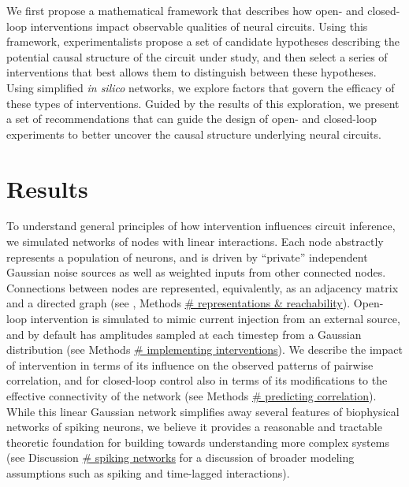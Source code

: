 \documentclass{article}
\begin{document}
We first propose a mathematical framework that describes how open- and closed-loop interventions impact observable qualities of neural circuits. Using this framework, experimentalists propose a set of candidate hypotheses describing the potential causal structure of the circuit under study, and then select a series of interventions that best allows them to distinguish between these hypotheses. Using simplified
\emph{in silico} networks, we explore factors that govern the efficacy of these types of interventions. Guided by the results of this exploration, we present a set of recommendations that can guide the design of open- and closed-loop experiments to better uncover the causal structure underlying neural circuits.

\hypertarget{results}{%
\section{Results}\label{results}}

To understand general principles of how intervention influences circuit inference, we simulated networks of nodes with linear interactions. Each node abstractly represents a population of neurons, and is driven by
``private'' independent Gaussian noise sources as well as weighted inputs from other connected nodes. Connections between nodes are represented, equivalently, as an adjacency matrix and a directed graph
(see \textcite{fornito2016connectivity}, Methods
\href{REF-SECTION-HERE}{\# representations \& reachability}). Open-loop intervention is simulated to mimic current injection from an external source, and by default has amplitudes sampled at each timestep from a Gaussian distribution (see Methods \href{REF-SECTION-HERE}{\#
implementing interventions}). We describe the impact of intervention in terms of its influence on the observed patterns of pairwise correlation, and for closed-loop control also in terms of its modifications to the effective connectivity of the network (see Methods
\href{REF-SECTION-HERE}{\# predicting correlation}). While this linear Gaussian network simplifies away several features of biophysical networks of spiking neurons, we believe it provides a reasonable and tractable theoretic foundation for building towards understanding more complex systems (see Discussion \href{REF-SECTION-HERE}{\# spiking networks} for a discussion of broader modeling assumptions such as spiking and time-lagged interactions).
\end{document}
